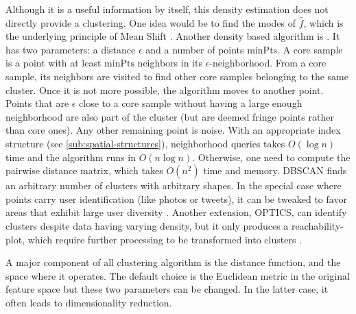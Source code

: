 Although it is a useful information by itself, this density estimation does
not directly provide a clustering. One idea would be to find the modes of
$\hat{f}$, which is the underlying principle of Mean Shift
\autocite{MeanShift95}. Another density based algorithm is
 \autocite{DBSCAN96}. It has two parameters: a
distance $\epsilon$ and a number of points $\mathrm{minPts}$. A core sample is
a point with at least $\mathrm{minPts}$ neighbors in its
$\epsilon$-neighborhood. From a core sample, its neighbors are visited to find
other core samples belonging to the same cluster. Once it is not more possible,
the algorithm moves to another point. Points that are $\epsilon$ close to a
core sample without having a large enough neighborhood are also part of the
cluster (but are deemed fringe points rather than core ones). Any other
remaining point is noise. With an appropriate index structure (see
\autoref{sub:spatial-structures}), neighborhood queries takes $O(\log n)$ time
and the algorithm runs in $O(n\log n)$. Otherwise, one need to compute the
pairwise distance matrix, which takes $O(n^2)$ time and memory. DBSCAN finds
an arbitrary number of clusters with arbitrary shapes. In the special case where
points carry user identification (like photos or tweets), it can be tweaked to
favor areas that exhibit large user diversity \autocite{PDBSCANKisilevich2010}.
Another extension, OPTICS, can identify clusters despite data having varying
density, but it only produces a reachability-plot, which require further
processing to be transformed into clusters \autocite{OPTICS99}.

\iffalse
\begin{comments}
	I didn't use these methods so I probably don't need to talk about it\\
	Some are based on graphs. For instance \methodname{Spectral
	Clustering} \autocite{SpectralClustering01} (which is related to
	Kernel $k$-means, as shown by \textcite{KernelKmeans04}).
	\methodname{Affinity Propagation} \autocite{AffinityPropagation07}

	Others are hierarchical
\url{https://en.wikipedia.org/wiki/Hierarchical_clustering}
\end{comments}
\fi

A major component of all clustering algorithm is the distance function, and
the space where it operates. The default choice is the Euclidean metric in the
original feature space but these two parameters can be changed. In the latter
case, it often leads to dimensionality reduction.

